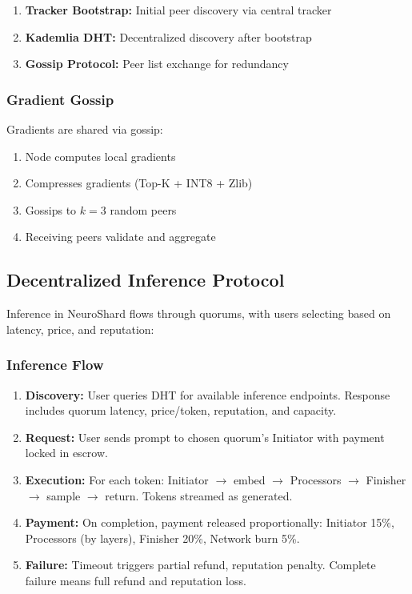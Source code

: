\documentclass[11pt,a4paper]{article}
\begin{document}
\begin{enumerate}
    \item \textbf{Tracker Bootstrap:} Initial peer discovery via central tracker
    \item \textbf{Kademlia DHT:} Decentralized discovery after bootstrap
    \item \textbf{Gossip Protocol:} Peer list exchange for redundancy
\end{enumerate}

\subsubsection{Gradient Gossip}
Gradients are shared via gossip:

\begin{enumerate}
    \item Node computes local gradients
    \item Compresses gradients (Top-K + INT8 + Zlib)
    \item Gossips to $k=3$ random peers
    \item Receiving peers validate and aggregate
\end{enumerate}

\subsection{Decentralized Inference Protocol}

Inference in NeuroShard flows through quorums, with users selecting based on latency, price, and reputation:

\subsubsection{Inference Flow}
\begin{enumerate}
    \item \textbf{Discovery:} User queries DHT for available inference endpoints. Response includes quorum latency, price/token, reputation, and capacity.
    \item \textbf{Request:} User sends prompt to chosen quorum's Initiator with payment locked in escrow.
    \item \textbf{Execution:} For each token: Initiator $\rightarrow$ embed $\rightarrow$ Processors $\rightarrow$ Finisher $\rightarrow$ sample $\rightarrow$ return. Tokens streamed as generated.
    \item \textbf{Payment:} On completion, payment released proportionally: Initiator 15\%, Processors (by layers), Finisher 20\%, Network burn 5\%.
    \item \textbf{Failure:} Timeout triggers partial refund, reputation penalty. Complete failure means full refund and reputation loss.
\end{enumerate}
\end{document}
